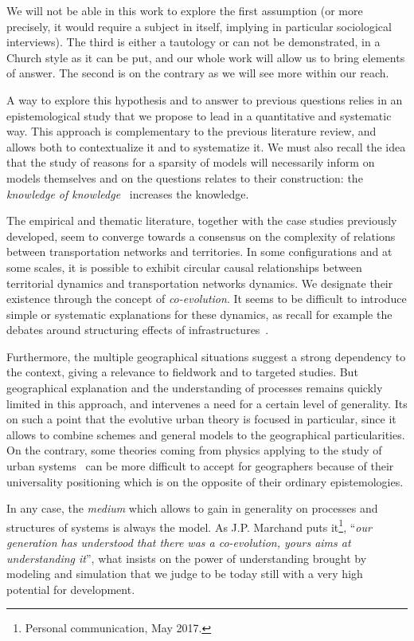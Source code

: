 \documentclass[galley]{jtlu-article-2col}
\begin{document}
We will not be able in this work to explore the first assumption (or more precisely, it would require a subject in itself, implying in particular sociological interviews). The third is either a tautology or can not be demonstrated, in a Church style as it can be put, and our whole work will allow us to bring elements of answer. The second is on the contrary as we will see more within our reach.

A way to explore this hypothesis and to answer to previous questions relies in an epistemological study that we propose to lead in a quantitative and systematic way. This approach is complementary to the previous literature review, and allows both to contextualize it and to systematize it. We must also recall the idea that the study of reasons for a sparsity of models will necessarily inform on models themselves and on the questions relates to their construction: the \emph{knowledge of knowledge}~\cite{morin1986methode} increases the knowledge.


The empirical and thematic literature, together with the case studies previously developed, seem to converge towards a consensus on the complexity of relations between transportation networks and territories. In some configurations and at some scales, it is possible to exhibit circular causal relationships between territorial dynamics and transportation networks dynamics. We designate their existence through the concept of \emph{co-evolution}. It seems to be difficult to introduce simple or systematic explanations for these dynamics, as recall for example the debates around structuring effects of infrastructures~\cite{offner1993effets}.

Furthermore, the multiple geographical situations suggest a strong dependency to the context, giving a relevance to fieldwork and to targeted studies. But geographical explanation and the understanding of processes remains quickly limited in this approach, and intervenes a need for a certain level of generality. Its on such a point that the evolutive urban theory is focused in particular, since it allows to combine schemes and general models to the geographical particularities. On the contrary, some theories coming from physics applying to the study of urban systems~\cite{west2017scale} can be more difficult to accept for geographers because of their universality positioning which is on the opposite of their ordinary epistemologies.

In any case, the \emph{medium} which allows to gain in generality on processes and structures of systems is always the model. As J.P. Marchand puts it\footnote{Personal communication, May 2017.}, ``\textit{our generation has understood that there was a co-evolution, yours aims at understanding it}'', what insists on the power of understanding brought by modeling and simulation that we judge to be today still with a very high potential for development.
\end{document}
